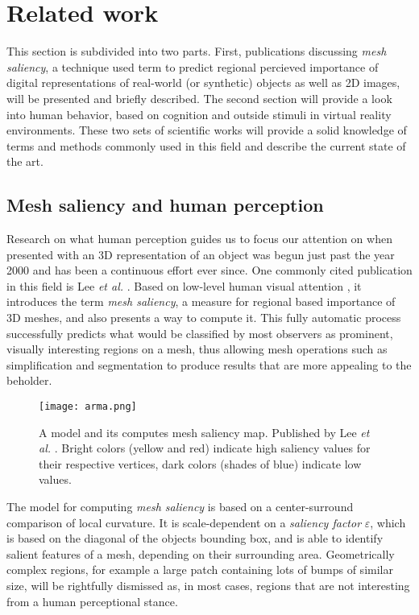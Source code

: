 \chapter{Related work}
\label{sec:related_work}

This section is subdivided into two parts. First, publications discussing \textit{mesh saliency}, a technique used term to predict regional percieved importance of digital representations of real-world (or synthetic) objects as well as 2D images, will be presented and briefly described. The second section will provide a look into human behavior, based on cognition and outside stimuli in virtual reality environments. These two sets of scientific works will provide a solid knowledge of terms and methods commonly used in this field and describe the current state of the art.

\section{Mesh saliency and human perception}
\label{sec:mesh_saliency_and_human_perception}

Research on what human perception guides us to focus our attention on when presented with an 3D representation of an object was begun just past the year 2000 and has been a continuous effort ever since. One commonly cited publication in this field is Lee \textit{et al.} \cite{lee2005mesh}. Based on low-level human visual attention \cite{koch1987shifts}, it introduces the term \textit{mesh saliency}, a measure for regional based importance of 3D meshes, and also presents a way to compute it. This fully automatic process successfully predicts  what would be classified by most observers as prominent, visually interesting regions on a mesh, thus allowing mesh operations such as simplification \cite{cignoni1998comparison} and segmentation \cite{shamir2008survey} to produce results that are more appealing to the beholder.

\begin{figure}[htb]
  \centering
  \texttt{[image: arma.png]}\\ %
  \caption{A model and its computes mesh saliency map. Published by Lee \textit{et al.} \cite{lee2005mesh}. Bright colors (yellow and red) indicate high saliency values for their respective vertices, dark colors (shades of blue) indicate low values.}\label{fig:lee_arma_map}
\end{figure}

The model for computing \textit{mesh saliency} is based on a center-surround comparison of local curvature. It is scale-dependent on a \textit{saliency factor} $\varepsilon$, which is based on the diagonal of the objects bounding box, and is able to identify salient features of a mesh, depending on their surrounding area. Geometrically complex regions, for example a large patch containing lots of bumps of similar size, will be rightfully dismissed as, in most cases, regions that are not interesting from a human perceptional stance.

